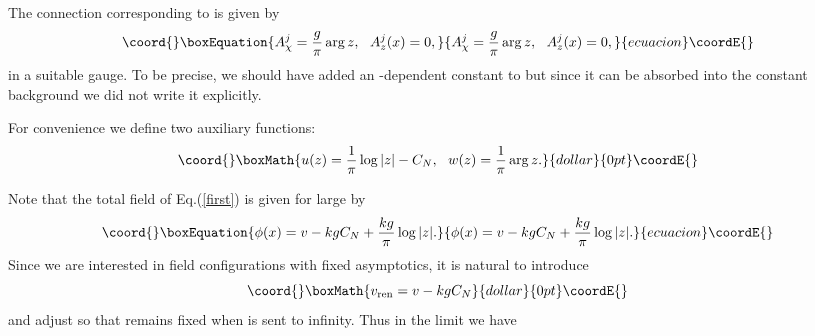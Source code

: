 \documentclass[a4paper,12pt, amsfonts, amssymb]{article}
\providecommand{\ra}{\rightarrow}
\providecommand{\vr}{v_{{\rm ren}}}
\begin{document}
The connection \coordHE{} corresponding
to \coordHE{} is given by
\begin{equation}\coord{}\boxEquation{
A^j_{\chi}=\frac{g}{\pi}\arg z, \ \ A^j_z(x)=0,
}{
A^j_{\chi}=\frac{g}{\pi}\arg z, \ \ A^j_z(x)=0,
}{ecuacion}\coordE{}\end{equation}
in a suitable gauge. To be precise, we should have added an \coordHE{}-dependent
constant to \coordHE{} but since it can be absorbed into the constant
background \coordHE{} we did not write it explicitly.

For convenience we define two auxiliary functions:
$$\coord{}\boxMath{u(z)=\frac{1}{\pi}\log|z|-C_N, \ \ w(z)=\frac{1}{\pi}\arg z.}{dollar}{0pt}\coordE{}$$

Note that the total field \coordHE{}
of Eq.(\ref{first}) is given for large \coordHE{} by
\begin{equation}\coord{}\boxEquation{
\phi(x)=v-kg C_N+\frac{kg}{\pi}\log|z|.
}{
\phi(x)=v-kg C_N+\frac{kg}{\pi}\log|z|.
}{ecuacion}\coordE{}\end{equation}
Since we are interested in field configurations with fixed asymptotics,
it is natural to introduce
$$\coord{}\boxMath{\vr=v-kg C_N}{dollar}{0pt}\coordE{}$$
and adjust \coordHE{} so that \myHighlight{$\vr$}\coordHE{} remains fixed when \coordHE{} is sent to infinity.
Thus in the limit \myHighlight{$N\ra +\infty$}\coordHE{} we have \myHighlight{$v\ra +\infty.$}\coordHE{}
\end{document}
